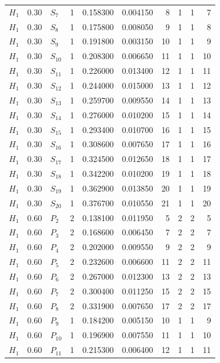 \begin{longtable}{lrlrrrrrrr}
$H_1$ & 0.30 & $S_{7}$ & 1 & 0.158300 & 0.004150 & 8 & 1 & 1 & 7\\
$H_1$ & 0.30 & $S_{8}$ & 1 & 0.175800 & 0.008050 & 9 & 1 & 1 & 8\\
$H_1$ & 0.30 & $S_{9}$ & 1 & 0.191800 & 0.003150 & 10 & 1 & 1 & 9\\
$H_1$ & 0.30 & $S_{10}$ & 1 & 0.208300 & 0.006650 & 11 & 1 & 1 & 10\\
$H_1$ & 0.30 & $S_{11}$ & 1 & 0.226000 & 0.013400 & 12 & 1 & 1 & 11\\
$H_1$ & 0.30 & $S_{12}$ & 1 & 0.244000 & 0.015000 & 13 & 1 & 1 & 12\\
$H_1$ & 0.30 & $S_{13}$ & 1 & 0.259700 & 0.009550 & 14 & 1 & 1 & 13\\
$H_1$ & 0.30 & $S_{14}$ & 1 & 0.276000 & 0.010200 & 15 & 1 & 1 & 14\\
$H_1$ & 0.30 & $S_{15}$ & 1 & 0.293400 & 0.010700 & 16 & 1 & 1 & 15\\
$H_1$ & 0.30 & $S_{16}$ & 1 & 0.308600 & 0.007650 & 17 & 1 & 1 & 16\\
$H_1$ & 0.30 & $S_{17}$ & 1 & 0.324500 & 0.012650 & 18 & 1 & 1 & 17\\
$H_1$ & 0.30 & $S_{18}$ & 1 & 0.342200 & 0.010200 & 19 & 1 & 1 & 18\\
$H_1$ & 0.30 & $S_{19}$ & 1 & 0.362900 & 0.013850 & 20 & 1 & 1 & 19\\
$H_1$ & 0.30 & $S_{20}$ & 1 & 0.376700 & 0.010550 & 21 & 1 & 1 & 20\\
$H_1$ & 0.60 & $P_{2}$ & 2 & 0.138100 & 0.011950 & 5 & 2 & 2 & 5\\
$H_1$ & 0.60 & $P_{3}$ & 2 & 0.168600 & 0.006450 & 7 & 2 & 2 & 7\\
$H_1$ & 0.60 & $P_{4}$ & 2 & 0.202000 & 0.009550 & 9 & 2 & 2 & 9\\
$H_1$ & 0.60 & $P_{5}$ & 2 & 0.232600 & 0.006600 & 11 & 2 & 2 & 11\\
$H_1$ & 0.60 & $P_{6}$ & 2 & 0.267000 & 0.012300 & 13 & 2 & 2 & 13\\
$H_1$ & 0.60 & $P_{7}$ & 2 & 0.300400 & 0.011250 & 15 & 2 & 2 & 15\\
$H_1$ & 0.60 & $P_{8}$ & 2 & 0.331900 & 0.007650 & 17 & 2 & 2 & 17\\
$H_1$ & 0.60 & $P_{9}$ & 1 & 0.184200 & 0.005150 & 10 & 1 & 1 & 9\\
$H_1$ & 0.60 & $P_{10}$ & 1 & 0.196900 & 0.007550 & 11 & 1 & 1 & 10\\
$H_1$ & 0.60 & $P_{11}$ & 1 & 0.215300 & 0.006400 & 12 & 1 & 1 & 11\\

\end{longtable}
